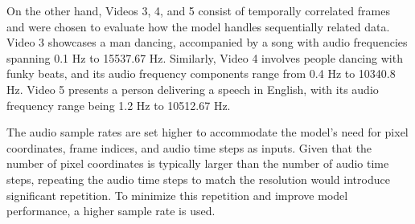 On the other hand, Videos 3, 4, and 5 consist of temporally correlated frames and were chosen to evaluate how the model handles sequentially related data. Video 3 showcases a man dancing, accompanied by a song with audio frequencies spanning 0.1 Hz to 15537.67 Hz. Similarly, Video 4 involves people dancing with funky beats, and its audio frequency components range from 0.4 Hz to 10340.8 Hz. Video 5 presents a person delivering a speech in English, with its audio frequency range being 1.2 Hz to 10512.67 Hz.

The audio sample rates are set higher to accommodate the model's need for pixel coordinates, frame indices, and audio time steps as inputs. Given that the number of pixel coordinates is typically larger than the number of audio time steps, repeating the audio time steps to match the resolution would introduce significant repetition. To minimize this repetition and improve model performance, a higher sample rate is used.



\pagebreak
